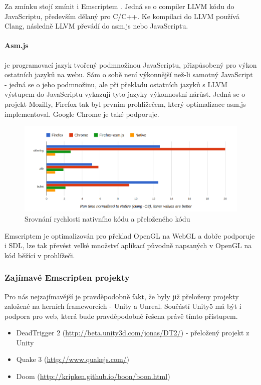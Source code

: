 \documentclass[12pt,a4paper,titlepage,final]{report}
\begin{document}
Za zmínku stojí zmínit i Emscriptem \cite{emscripten-pres}. Jedná se o compiler LLVM kódu do JavaScriptu, především dělaný pro C/C++. Ke kompilaci do LLVM používá Clang, následně LLVM převádí do asm.js nebo JavaScriptu.

\paragraph{Asm.js} \cite{asmjs} je programovací jazyk tvořený podmnožinou JavaScriptu, přizpůsobený pro výkon ostatních jazyků na webu. Sám o sobě není výkonnější než-li samotný JavaScript - jedná se o jeho podmnožinu, ale při překladu ostatních jazyků s LLVM výstupem do JavaScriptu vykazují tyto jazyky výkonnostní nárůst. Jedná se o projekt Mozilly, Firefox tak byl prvním prohlížečem, který optimalizace asm.js implementoval. Google Chrome je také podporuje.

\begin{figure}[ht]
\begin{center}
\includegraphics[width=14cm]{images/micro3b.png}
\caption{Srovnání rychlosti nativního kódu a přeloženého kódu}
\label{fig:theory}
\end{center}
\end{figure}

Emscriptem je optimalizován pro překlad OpenGL na WebGL a dobře podporuje i SDL, lze tak převést velké množství aplikací původně napsaných v OpenGL na kód běžící v prohlížeči.

\subsubsection{Zajímavé Emscripten projekty}

Pro nás nejzajímavější je pravděpodobně fakt, že byly již přeloženy projekty založené na herních frameworcích - Unity \cite{unity} a Unreal. Součástí Unity5 má být i podpora pro web, která bude pravděpodobně řešena právě tímto přístupem.

\begin{itemize}
	\item DeadTrigger 2 (\url{http://beta.unity3d.com/jonas/DT2/}) - přeložený projekt z Unity
	\item Quake 3 (\url{http://www.quakejs.com/})
	\item Doom (\url{http://kripken.github.io/boon/boon.html})
\end{itemize}
\end{document}
